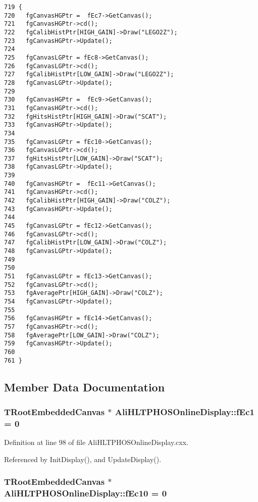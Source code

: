 \footnotesize\begin{verbatim}719 {
720   fgCanvasHGPtr =  fEc7->GetCanvas();
721   fgCanvasHGPtr->cd();
722   fgCalibHistPtr[HIGH_GAIN]->Draw("LEGO2Z");
723   fgCanvasHGPtr->Update();
724 
725   fgCanvasLGPtr = fEc8->GetCanvas();
726   fgCanvasLGPtr->cd();
727   fgCalibHistPtr[LOW_GAIN]->Draw("LEGO2Z");
728   fgCanvasLGPtr->Update();
729 
730   fgCanvasHGPtr =  fEc9->GetCanvas();
731   fgCanvasHGPtr->cd();
732   fgHitsHistPtr[HIGH_GAIN]->Draw("SCAT");
733   fgCanvasHGPtr->Update();
734 
735   fgCanvasLGPtr = fEc10->GetCanvas();
736   fgCanvasLGPtr->cd();
737   fgHitsHistPtr[LOW_GAIN]->Draw("SCAT");
738   fgCanvasLGPtr->Update();
739 
740   fgCanvasHGPtr =  fEc11->GetCanvas();
741   fgCanvasHGPtr->cd();
742   fgCalibHistPtr[HIGH_GAIN]->Draw("COLZ");
743   fgCanvasHGPtr->Update();
744 
745   fgCanvasLGPtr = fEc12->GetCanvas();
746   fgCanvasLGPtr->cd();
747   fgCalibHistPtr[LOW_GAIN]->Draw("COLZ");
748   fgCanvasLGPtr->Update();
749 
750 
751   fgCanvasLGPtr = fEc13->GetCanvas();
752   fgCanvasLGPtr->cd();
753   fgAveragePtr[HIGH_GAIN]->Draw("COLZ");
754   fgCanvasLGPtr->Update();
755 
756   fgCanvasHGPtr = fEc14->GetCanvas();
757   fgCanvasHGPtr->cd();
758   fgAveragePtr[LOW_GAIN]->Draw("COLZ");
759   fgCanvasHGPtr->Update();
760 
761 }
\end{verbatim}\normalsize 




\subsection{Member Data Documentation}
\subsubsection{\setlength{\rightskip}{0pt plus 5cm}TRoot\-Embedded\-Canvas $\ast$ {\bf Ali\-HLTPHOSOnline\-Display::f\-Ec1} = 0\hspace{0.3cm}{\tt  [static, private]}}\label{classAliHLTPHOSOnlineDisplay_v22}




Definition at line 98 of file Ali\-HLTPHOSOnline\-Display.cxx.

Referenced by Init\-Display(), and Update\-Display().
\subsubsection{\setlength{\rightskip}{0pt plus 5cm}TRoot\-Embedded\-Canvas $\ast$ {\bf Ali\-HLTPHOSOnline\-Display::f\-Ec10} = 0\hspace{0.3cm}{\tt  [static, private]}}\label{classAliHLTPHOSOnlineDisplay_v31}




